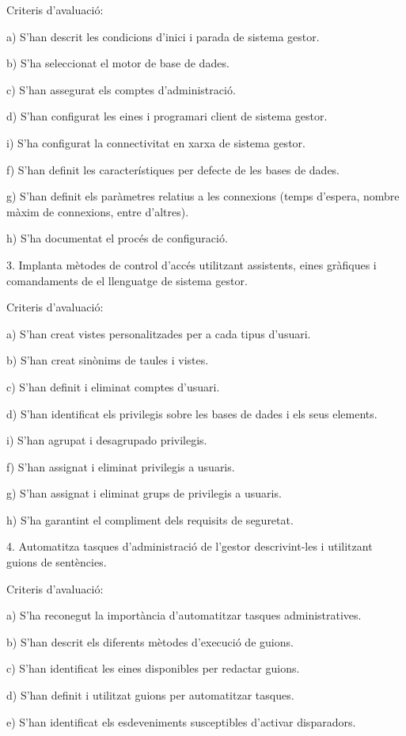 \documentclass[catalan, a4paper, 12pt, titlepage]{article}
\begin{document}
Criteris d'avaluació:

a) S'han descrit les condicions d'inici i parada de sistema gestor.

b) S'ha seleccionat el motor de base de dades.

c) S'han assegurat els comptes d'administració.

d) S'han configurat les eines i programari client de sistema gestor.

i) S'ha configurat la connectivitat en xarxa de sistema gestor.

f) S'han definit les característiques per defecte de les bases de dades.

g) S'han definit els paràmetres relatius a les connexions (temps d'espera, nombre màxim de connexions, entre d'altres).

h) S'ha documentat el procés de configuració.

3. Implanta mètodes de control d'accés utilitzant assistents, eines gràfiques i comandaments de el llenguatge de sistema gestor.

Criteris d'avaluació:

a) S'han creat vistes personalitzades per a cada tipus d'usuari.

b) S'han creat sinònims de taules i vistes.

c) S'han definit i eliminat comptes d'usuari.

d) S'han identificat els privilegis sobre les bases de dades i els seus elements.

i) S'han agrupat i desagrupado privilegis.

f) S'han assignat i eliminat privilegis a usuaris.

g) S'han assignat i eliminat grups de privilegis a usuaris.

h) S'ha garantint el compliment dels requisits de seguretat.

4. Automatitza tasques d'administració de l'gestor descrivint-les i utilitzant guions de sentències.

Criteris d'avaluació:

a) S'ha reconegut la importància d'automatitzar tasques administratives.

b) S'han descrit els diferents mètodes d'execució de guions.

c) S'han identificat les eines disponibles per redactar guions.

d) S'han definit i utilitzat guions per automatitzar tasques.

e) S'han identificat els esdeveniments susceptibles d'activar disparadors.
\end{document}
